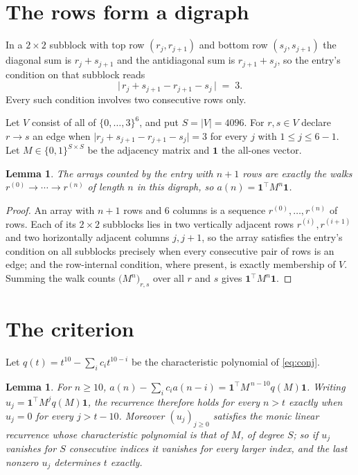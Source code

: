 \documentclass[11pt,a4paper]{article}
\theoremstyle{plain}
\newtheorem{lemma}[theorem]{Lemma}
\theoremstyle{definition}
\begin{document}
\section{The rows form a digraph}

In a $2\times2$ subblock with top row $(r_j,r_{j+1})$ and bottom row $(s_j,s_{j+1})$ the
diagonal sum is $r_j+s_{j+1}$ and the antidiagonal sum is $r_{j+1}+s_j$, so the entry's
condition on that subblock reads
\[
\bigl|\,r_j+s_{j+1}-r_{j+1}-s_j\,\bigr|\;=\;3.
\]
Every such condition involves two consecutive rows only.

Let $V$ consist of all of $\{0,\dots,3\}^{6}$, and put $S=|V|=4096$. For $r,s\in V$ declare $r\to s$ an edge
when $\bigl|r_j+s_{j+1}-r_{j+1}-s_j\bigr|=3$ for every $j$ with
$1\le j\le6-1$. Let $M\in\{0,1\}^{S\times S}$ be the adjacency matrix and $\mathbf{1}$
the all-ones vector.

\begin{lemma}\label{lem:walk}
The arrays counted by the entry with $n+1$ rows are exactly the walks
$r^{(0)}\to\cdots\to r^{(n)}$ of length $n$ in this digraph, so
$a(n)=\mathbf{1}^{\!\top}M^{n}\mathbf{1}$.
\end{lemma}

\begin{proof}
An array with $n+1$ rows and $6$ columns is a sequence $r^{(0)},\dots,r^{(n)}$ of
rows. Each of its $2\times2$ subblocks lies in two vertically adjacent rows
$r^{(i)},r^{(i+1)}$ and two horizontally adjacent columns $j,j+1$, so the array satisfies
the entry's condition on all subblocks precisely when every consecutive pair of rows is an
edge; and the row-internal condition, where present, is exactly membership of $V$. Summing
the walk counts $\bigl(M^{n}\bigr)_{r,s}$ over all $r$ and $s$ gives
$\mathbf{1}^{\!\top}M^{n}\mathbf{1}$.
\end{proof}

\section{The criterion}

Let $q(t)=t^{10}-\sum_i c_i t^{10-i}$ be the characteristic polynomial of
\eqref{eq:conj}.

\begin{lemma}\label{lem:crit}
For $n\ge10$,
$a(n)-\sum_i c_i a(n-i)=\mathbf{1}^{\!\top}M^{\,n-10}q(M)\mathbf{1}$. Writing
$u_j=\mathbf{1}^{\!\top}M^{j}q(M)\mathbf{1}$, the recurrence therefore holds for every
$n>t$ exactly when $u_j=0$ for every $j>t-10$. Moreover $(u_j)_{j\ge0}$ satisfies the
monic linear recurrence whose characteristic polynomial is that of $M$, of degree $S$; so
if $u_j$ vanishes for $S$ consecutive indices it vanishes for every larger index, and the
last nonzero $u_j$ determines $t$ exactly.
\end{lemma}
\end{document}
